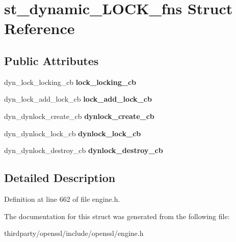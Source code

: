 \hypertarget{structst__dynamic___l_o_c_k__fns}{}\section{st\+\_\+dynamic\+\_\+\+L\+O\+C\+K\+\_\+fns Struct Reference}
\label{structst__dynamic___l_o_c_k__fns}
\subsection*{Public Attributes}
\begin{DoxyCompactItemize}
\item 
\mbox{\label{structst__dynamic___l_o_c_k__fns_a495ddb05b36eee18ce44ed977c6f6d8d}} 
dyn\+\_\+lock\+\_\+locking\+\_\+cb {\bfseries lock\+\_\+locking\+\_\+cb}
\item 
\mbox{\label{structst__dynamic___l_o_c_k__fns_aa7178025f352542e04bb37fd3be59396}} 
dyn\+\_\+lock\+\_\+add\+\_\+lock\+\_\+cb {\bfseries lock\+\_\+add\+\_\+lock\+\_\+cb}
\item 
\mbox{\label{structst__dynamic___l_o_c_k__fns_ad4ec885da11188275dd9e34ef4fe3823}} 
dyn\+\_\+dynlock\+\_\+create\+\_\+cb {\bfseries dynlock\+\_\+create\+\_\+cb}
\item 
\mbox{\label{structst__dynamic___l_o_c_k__fns_a71056a41e6dd1c75eb00ea605bb4945a}} 
dyn\+\_\+dynlock\+\_\+lock\+\_\+cb {\bfseries dynlock\+\_\+lock\+\_\+cb}
\item 
\mbox{\label{structst__dynamic___l_o_c_k__fns_a2a6856844c40ccbb931117bbf775f306}} 
dyn\+\_\+dynlock\+\_\+destroy\+\_\+cb {\bfseries dynlock\+\_\+destroy\+\_\+cb}
\end{DoxyCompactItemize}


\subsection{Detailed Description}


Definition at line 662 of file engine.\+h.



The documentation for this struct was generated from the following file\+:\begin{DoxyCompactItemize}
\item 
thirdparty/openssl/include/openssl/engine.\+h\end{DoxyCompactItemize}
